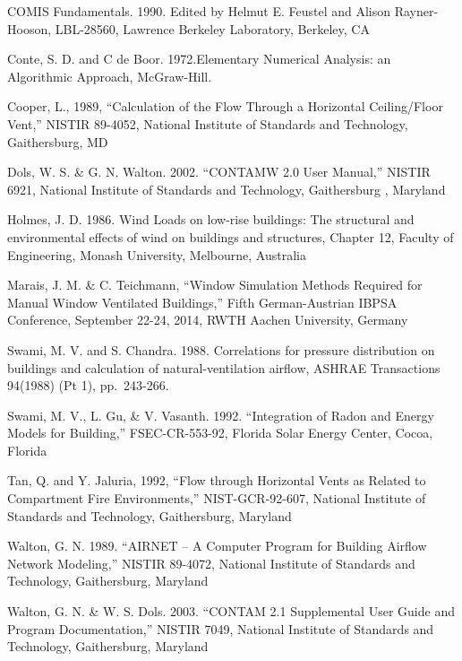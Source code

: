 COMIS Fundamentals. 1990. Edited by Helmut E. Feustel and Alison Rayner-Hooson, LBL-28560, Lawrence Berkeley Laboratory, Berkeley, CA

Conte, S. D. and C de Boor. 1972.Elementary Numerical Analysis: an Algorithmic Approach, McGraw-Hill.

Cooper, L., 1989, ``Calculation of the Flow Through a Horizontal Ceiling/Floor Vent,'' NISTIR 89-4052, National Institute of Standards and Technology, Gaithersburg, MD

Dols, W. S. \& G. N. Walton. 2002. ``CONTAMW 2.0 User Manual,'' NISTIR 6921, National Institute of Standards and Technology, Gaithersburg , Maryland

Holmes, J. D. 1986. Wind Loads on low-rise buildings: The structural and environmental effects of wind on buildings and structures, Chapter 12, Faculty of Engineering, Monash University, Melbourne, Australia

Marais, J. M. \& C. Teichmann, ``Window Simulation Methods Required for Manual Window Ventilated Buildings,'' Fifth German-Austrian IBPSA Conference, September 22-24, 2014, RWTH Aachen University, Germany

Swami, M. V. and S. Chandra. 1988. Correlations for pressure distribution on buildings and calculation of natural-ventilation airflow, ASHRAE Transactions 94(1988) (Pt 1), pp.~243-266.

Swami, M. V., L. Gu, \& V. Vasanth. 1992. ``Integration of Radon and Energy Models for Building,'' FSEC-CR-553-92, Florida Solar Energy Center, Cocoa, Florida

Tan, Q. and Y. Jaluria, 1992, ``Flow through Horizontal Vents as Related to Compartment Fire Environments,'' NIST-GCR-92-607, National Institute of Standards and Technology, Gaithersburg, Maryland

Walton, G. N. 1989. ``AIRNET -- A Computer Program for Building Airflow Network Modeling,'' NISTIR 89-4072, National Institute of Standards and Technology, Gaithersburg, Maryland

Walton, G. N. \& W. S. Dols. 2003. ``CONTAM 2.1 Supplemental User Guide and Program Documentation,'' NISTIR 7049, National Institute of Standards and Technology, Gaithersburg, Maryland
